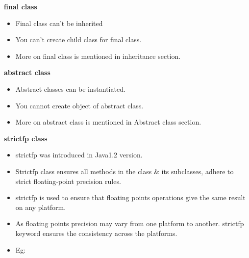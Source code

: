 \begin{flushleft}
	\newpage
	\textbf{final class}
	\begin{itemize}
		\item Final class can’t be inherited 
		\item You can’t create child class for final class.
		\item More on final class is mentioned in inheritance section.
	\end{itemize}

	\textbf{abstract class}
	\begin{itemize}
		\item Abstract classes can be instantiated.
		\item You cannot create object of abstract class.
		\item More on abstract class is mentioned in Abstract class section.
	\end{itemize}

	\textbf{strictfp class}
	\begin{itemize}
		\item strictfp was introduced in Java1.2 version.
		\item Strictfp class ensures all methods in the class \& its subclasses, adhere to strict floating-point precision rules.
		\item strictfp is used to ensure that floating points operations give the same result on any platform. 
		\item As floating points precision may vary from one platform to another. strictfp keyword ensures the consistency across the platforms.
		\item Eg:
		\newpage
		
		\bigskip
		
	\end{itemize}
	
\end{flushleft}

\newpage
